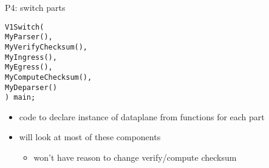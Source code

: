 \begin{frame}[fragile]{P4: switch parts}
\begin{Verbatim}
V1Switch(
MyParser(),
MyVerifyChecksum(),
MyIngress(),
MyEgress(),
MyComputeChecksum(),
MyDeparser()
) main;
\end{Verbatim}
\begin{itemize}
\item code to declare instance of dataplane from functions for each part
\item will look at most of these components
    \begin{itemize}
    \item won't have reason to change verify/compute checksum
    \end{itemize}
\end{itemize}
\end{frame}
